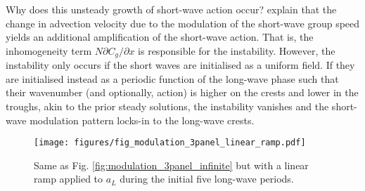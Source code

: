 \documentclass[lineno]{jfm}
\begin{document}
Why does this unsteady growth of short-wave action occur?
\citet{peureux2021unsteady} explain that the change in advection velocity due to
the modulation of the short-wave group speed yields an additional amplification
of the short-wave action.
That is, the inhomogeneity term $N \partial C_g / \partial x$ is
responsible for the instability.
However, the instability only occurs if the short waves are initialised as a
uniform field.
If they are initialised instead as a periodic function of the long-wave phase
such that their wavenumber (and optionally, action) is higher on the crests
and lower in the troughs, akin to the prior steady solutions, the instability
vanishes and the short-wave modulation pattern locks-in to the long-wave
crests.

\begin{figure}
\centering
\texttt{[image: figures/fig\_modulation\_3panel\_linear\_ramp.pdf]}
\caption{
  Same as Fig. \ref{fig:modulation_3panel_infinite} but with a linear ramp
  applied to $a_L$ during the initial five long-wave periods.
}
\label{fig:modulation_3panel_ramp}
\end{figure}
\end{document}
